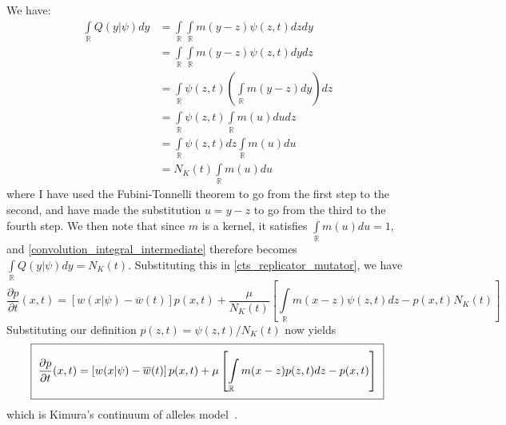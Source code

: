 We have: 
\begin{align}
\int\limits_{\mathbb{R}} Q(y|\psi)dy &= \int\limits_{\mathbb{R}}\int\limits_{\mathbb{R}} m(y-z)\psi(z,t)dzdy\nonumber\\
&= \int\limits_{\mathbb{R}}\int\limits_{\mathbb{R}} m(y-z)\psi(z,t)dydz\nonumber\\
&= \int\limits_{\mathbb{R}}\psi(z,t)\left(\int\limits_{\mathbb{R}} m(y-z)dy\right)dz\nonumber\\
&= \int\limits_{\mathbb{R}}\psi(z,t)\int\limits_{\mathbb{R}} m(u)dudz\nonumber\\
&= \int\limits_{\mathbb{R}}\psi(z,t)dz\int\limits_{\mathbb{R}} m(u)du\nonumber\\
&= N_K(t)\int\limits_{\mathbb{R}} m(u)du\label{convolution_integral_intermediate}
\end{align}
where I have used the Fubini-Tonnelli theorem to go from the first step to the second, and have made the substitution $u = y-z$ to go from the third to the fourth step. We then note that since $m$ is a kernel, it satisfies $\int\limits_{\mathbb{R}} m(u)du = 1$, and \eqref{convolution_integral_intermediate} therefore becomes $\int\limits_{\mathbb{R}} Q(y|\psi)dy = N_K(t)$. Substituting this in \eqref{cts_replicator_mutator}, we have
\begin{equation*}
\frac{\partial p}{\partial t}(x,t) = \left[w(x|\psi) - \overline{w}(t)\right]p(x,t)+\frac{\mu}{N_K(t)}\left[\int\limits_{\mathbb{R}}m(x-z)\psi(z,t)dz - p(x,t)N_K(t)\right]
\end{equation*}
Substituting our definition $p(z,t) = \psi(z,t)/N_K(t)$ now yields
\begin{equation}
\setlength{\fboxsep}{2\fboxsep}\boxed{\frac{\partial p}{\partial t}(x,t) = \left[w(x|\psi) - \overline{w}(t)\right]p(x,t)+\mu\left[\int\limits_{\mathbb{R}}m(x-z)p(z,t)dz - p(x,t)\right]}\label{kimura_continuum_model}
\end{equation}
which is Kimura's continuum of alleles model~\citep{kimura_stochastic_1965,crow_introduction_1970}.

